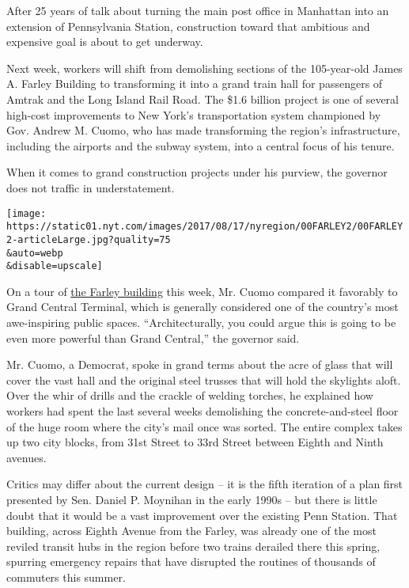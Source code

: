 After 25 years of talk about turning the main post office in Manhattan
into an extension of Pennsylvania Station, construction toward that
ambitious and expensive goal is about to get underway.

Next week, workers will shift from demolishing sections of the
105-year-old James A. Farley Building to transforming it into a grand
train hall for passengers of Amtrak and the Long Island Rail Road. The
\$1.6 billion project is one of several high-cost improvements to New
York's transportation system championed by Gov. Andrew M. Cuomo, who has
made transforming the region's infrastructure, including the airports
and the subway system, into a central focus of his tenure.

When it comes to grand construction projects under his purview, the
governor does not traffic in understatement.

\texttt{[image: https://static01.nyt.com/images/2017/08/17/nyregion/00FARLEY2/00FARLEY2-articleLarge.jpg?quality=75\\\&auto=webp\\\&disable=upscale]}

On a tour of
\href{https://www.nytimes.com/2016/01/07/nyregion/cuomo-lays-out-renovation-plan-for-penn-station-and-farley-post-office.html}{the
Farley building} this week, Mr. Cuomo compared it favorably to Grand
Central Terminal, which is generally considered one of the country's
most awe-inspiring public spaces. ``Architecturally, you could argue
this is going to be even more powerful than Grand Central,'' the
governor said.

Mr. Cuomo, a Democrat, spoke in grand terms about the acre of glass that
will cover the vast hall and the original steel trusses that will hold
the skylights aloft. Over the whir of drills and the crackle of welding
torches, he explained how workers had spent the last several weeks
demolishing the concrete-and-steel floor of the huge room where the
city's mail once was sorted. The entire complex takes up two city
blocks, from 31st Street to 33rd Street between Eighth and Ninth
avenues.

Critics may differ about the current design -- it is the fifth iteration
of a plan first presented by Sen. Daniel P. Moynihan in the early 1990s
-- but there is little doubt that it would be a vast improvement over
the existing Penn Station. That building, across Eighth Avenue from the
Farley, was already one of the most reviled transit hubs in the region
before two trains derailed there this spring, spurring emergency repairs
that have disrupted the routines of thousands of commuters this summer.

